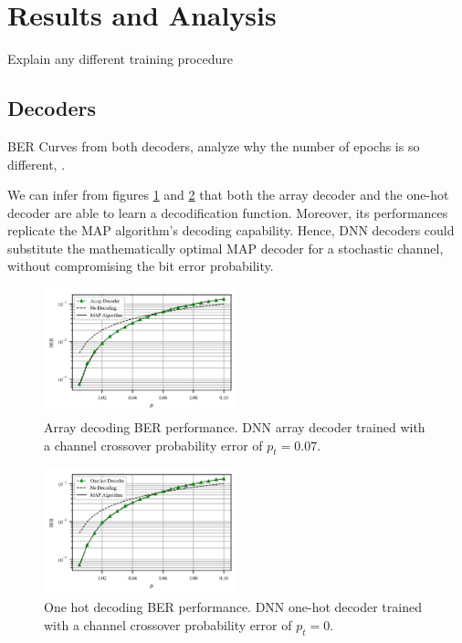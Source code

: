 \documentclass[conference]{IEEEtran}
\begin{document}
\section{Results and Analysis}

Explain any different training procedure

\subsection{Decoders}
BER Curves from both decoders, analyze why the number of epochs is so different, .

We can infer from figures \ref{fig:ArrayD} and \ref{fig:1HD} that both the array decoder and the one-hot decoder are able to learn a decodification function. Moreover,  its performances replicate the MAP algorithm's decoding capability. Hence, DNN decoders could substitute the mathematically optimal MAP decoder for a stochastic channel, without compromising the bit error probability.

\begin{figure}[!ht]
  \centering
    \includegraphics[width=0.5\textwidth]{images/MLNN_Mep_65536_ptrain_007}
    \caption{Array decoding BER performance. DNN array decoder trained with a channel crossover probability error of $p_t=0.07$.}\label{fig:ArrayD}
\end{figure}

\begin{figure}[!ht]
  \centering
    \includegraphics[width=0.5\textwidth]{images/MLNN1H_Mep_16384_ptrain_0}
    \caption{One hot decoding BER performance. DNN one-hot decoder trained with a channel crossover probability error of $p_t=0$.}\label{fig:1HD}
\end{figure}
\end{document}
